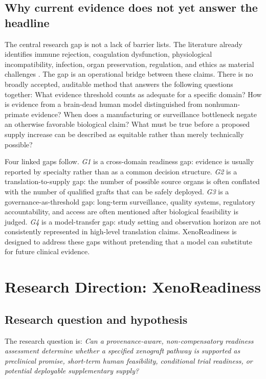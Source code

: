 \documentclass[conference]{IEEEtran}
\begin{document}
\subsection{Why current evidence does not yet answer the headline}

The central research gap is not a lack of barrier lists. The literature already identifies immune rejection, coagulation dysfunction, physiological incompatibility, infection, organ preservation, regulation, and ethics as material challenges \cite{boulet2022,goerlich2021,ali2023}. The gap is an operational bridge between these claims. There is no broadly accepted, auditable method that answers the following questions together: What evidence threshold counts as adequate for a specific domain? How is evidence from a brain-dead human model distinguished from nonhuman-primate evidence? When does a manufacturing or surveillance bottleneck negate an otherwise favorable biological claim? What must be true before a proposed supply increase can be described as equitable rather than merely technically possible?

Four linked gaps follow. \emph{G1} is a cross-domain readiness gap: evidence is usually reported by specialty rather than as a common decision structure. \emph{G2} is a translation-to-supply gap: the number of possible source organs is often conflated with the number of qualified grafts that can be safely deployed. \emph{G3} is a governance-as-threshold gap: long-term surveillance, quality systems, regulatory accountability, and access are often mentioned after biological feasibility is judged. \emph{G4} is a model-transfer gap: study setting and observation horizon are not consistently represented in high-level translation claims. XenoReadiness is designed to address these gaps without pretending that a model can substitute for future clinical evidence.

\section{Research Direction: XenoReadiness}

\subsection{Research question and hypothesis}

The research question is: \emph{Can a provenance-aware, non-compensatory readiness assessment determine whether a specified xenograft pathway is supported as preclinical promise, short-term human feasibility, conditional trial readiness, or potential deployable supplementary supply?}
\end{document}
